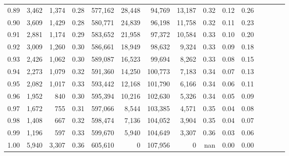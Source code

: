 \begin{tabular}{rrrcrrrrrrrrrrr}
0.89 &   3,462 &  1,374 &                                       0.28 &  577,162 &   28,448 &   94,769 &   13,187 &  0.32 &  0.12 &                         0.26 \\
0.90 &   3,609 &  1,429 &                                       0.28 &  580,771 &   24,839 &   96,198 &   11,758 &  0.32 &  0.11 &                         0.23 \\
0.91 &   2,881 &  1,174 &                                       0.29 &  583,652 &   21,958 &   97,372 &   10,584 &  0.33 &  0.10 &                         0.20 \\
0.92 &   3,009 &  1,260 &                                       0.30 &  586,661 &   18,949 &   98,632 &    9,324 &  0.33 &  0.09 &                         0.18 \\
0.93 &   2,426 &  1,062 &                                       0.30 &  589,087 &   16,523 &   99,694 &    8,262 &  0.33 &  0.08 &                         0.15 \\
0.94 &   2,273 &  1,079 &                                       0.32 &  591,360 &   14,250 &  100,773 &    7,183 &  0.34 &  0.07 &                         0.13 \\
0.95 &   2,082 &  1,017 &                                       0.33 &  593,442 &   12,168 &  101,790 &    6,166 &  0.34 &  0.06 &                         0.11 \\
0.96 &   1,952 &    840 &                                       0.30 &  595,394 &   10,216 &  102,630 &    5,326 &  0.34 &  0.05 &                         0.09 \\
0.97 &   1,672 &    755 &                                       0.31 &  597,066 &    8,544 &  103,385 &    4,571 &  0.35 &  0.04 &                         0.08 \\
0.98 &   1,408 &    667 &                                       0.32 &  598,474 &    7,136 &  104,052 &    3,904 &  0.35 &  0.04 &                         0.07 \\
0.99 &   1,196 &    597 &                                       0.33 &  599,670 &    5,940 &  104,649 &    3,307 &  0.36 &  0.03 &                         0.06 \\
1.00 &   5,940 &  3,307 &                                       0.36 &  605,610 &        0 &  107,956 &        0 &   nan &  0.00 &                         0.00 \\
\bottomrule
\end{tabular}
